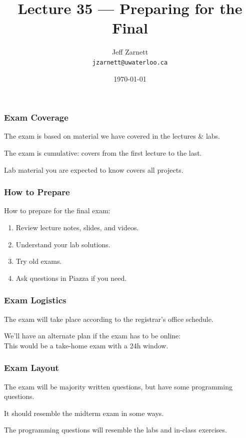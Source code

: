 

\title{Lecture 35 --- Preparing for the Final }

\author{Jeff Zarnett \\ \small \texttt{jzarnett@uwaterloo.ca}}
\date{\today}




\begin{frame}
  \titlepage

\end{frame}

\begin{frame}
\frametitle{Exam Coverage}

The exam is based on material we have covered in the lectures \& labs.

The exam is cumulative: covers from the first lecture to the last.

Lab material you are expected to know covers all projects.

\end{frame}

\begin{frame}
\frametitle{How to Prepare}

How to prepare for the final exam:

\begin{enumerate}
	\item Review lecture notes, slides, and videos.
	\item Understand your lab solutions.
	\item Try old exams.
	\item Ask questions in Piazza if you need.
\end{enumerate}

\end{frame}


\begin{frame}
\frametitle{Exam Logistics}

The exam will take place according to the registrar's office schedule.

We'll have an alternate plan if the exam has to be online:\\
\quad This would be a take-home exam with a 24h window.

\end{frame}


\begin{frame}
\frametitle{Exam Layout}

The exam will be majority written questions, but have some programming questions.

It should resemble the midterm exam in some ways.

The programming questions will resemble the labs and in-class exercises.

\end{frame}


